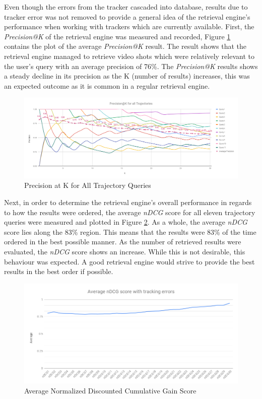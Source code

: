 Even though the errors from the tracker\cite{lim2017} cascaded into database, results due to tracker error was not removed to provide a general idea of the retrieval engine's performance when working with trackers which are currently available. First, the \textit{Precision@K} of the retrieval engine was measured and recorded, Figure \ref{fig:versionTwoPreAtK} contains the plot of the average \textit{Precision@K} result. The result shows that the retrieval engine managed to retrieve video shots which were relatively relevant to the user's query with an average precision of 76\%. The \textit{Precision@K} results shows a steady decline in its precision as the K (number of results) increases, this was an expected outcome as it is common in a regular retrieval engine. 

\begin{figure}[!ht]
  \centering
    \includegraphics[width=\linewidth]{image/retrievalTwo/p@k.png}
  \caption{Precision at K for All Trajectory Queries}
  \label{fig:versionTwoPreAtK}
\end{figure}

Next, in order to determine the retrieval engine's overall performance in regards to how the results were ordered, the average \textit{nDCG} score for all eleven trajectory queries were measured and plotted in Figure \ref{fig:ndcgWithError}. As a whole, the average \textit{nDCG} score lies along the 83\% region. This means that the results were 83\% of the time ordered in the best possible manner. As the number of retrieved results were evaluated, the \textit{nDCG} score shows an increase. 
While this is not desirable, this behaviour was expected. A good retrieval engine would strive to provide the best results in the best order if possible.  

\begin{figure}[!h]
  \centering
    \includegraphics[width=0.9\linewidth]{image/retrievalTwo/averageNDCG.png}
  \caption{Average Normalized Discounted Cumulative Gain Score}
  \label{fig:ndcgWithError}
\end{figure}

